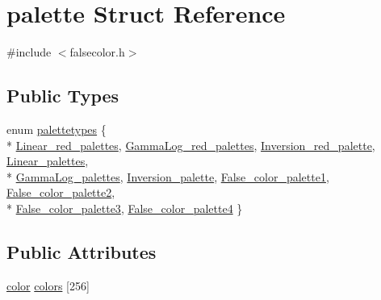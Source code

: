 \hypertarget{structpalette}{\section{palette Struct Reference}
\label{structpalette}
}


{\ttfamily \#include $<$falsecolor.\-h$>$}

\subsection*{Public Types}
\begin{DoxyCompactItemize}
\item 
enum \hyperlink{structpalette_a36a379b3f92c8aebabe2074a6f4a0349}{palettetypes} \{ \\*
\hyperlink{structpalette_a36a379b3f92c8aebabe2074a6f4a0349aa638215b2f2b858665cf6d3e32c6da25}{Linear\-\_\-red\-\_\-palettes}, 
\hyperlink{structpalette_a36a379b3f92c8aebabe2074a6f4a0349a0b937de41bb254e2ef45769ef8912d82}{Gamma\-Log\-\_\-red\-\_\-palettes}, 
\hyperlink{structpalette_a36a379b3f92c8aebabe2074a6f4a0349abfa67394269763a4a69e26ba9fd1f9d6}{Inversion\-\_\-red\-\_\-palette}, 
\hyperlink{structpalette_a36a379b3f92c8aebabe2074a6f4a0349a620a9481a7c6cf6a01e4fa6b34372382}{Linear\-\_\-palettes}, 
\\*
\hyperlink{structpalette_a36a379b3f92c8aebabe2074a6f4a0349a806c35cb775afcd09b4ce61158bd7a90}{Gamma\-Log\-\_\-palettes}, 
\hyperlink{structpalette_a36a379b3f92c8aebabe2074a6f4a0349adad07363e06e1c53f34465a700244610}{Inversion\-\_\-palette}, 
\hyperlink{structpalette_a36a379b3f92c8aebabe2074a6f4a0349afb202b06fbdc8012d979ef6d63542da6}{False\-\_\-color\-\_\-palette1}, 
\hyperlink{structpalette_a36a379b3f92c8aebabe2074a6f4a0349a4970eb811717df651727e708db35c6b3}{False\-\_\-color\-\_\-palette2}, 
\\*
\hyperlink{structpalette_a36a379b3f92c8aebabe2074a6f4a0349a9cecb4d863448cd193e6622c2f132eb1}{False\-\_\-color\-\_\-palette3}, 
\hyperlink{structpalette_a36a379b3f92c8aebabe2074a6f4a0349a731f14daf6f08287bf4d9b604be9e50c}{False\-\_\-color\-\_\-palette4}
 \}
\end{DoxyCompactItemize}
\subsection*{Public Attributes}
\begin{DoxyCompactItemize}
\item 
\hyperlink{structcolor}{color} \hyperlink{structpalette_aa1a2941bd65472f07de5e54bcf36678b}{colors} \mbox{[}256\mbox{]}
\end{DoxyCompactItemize}


